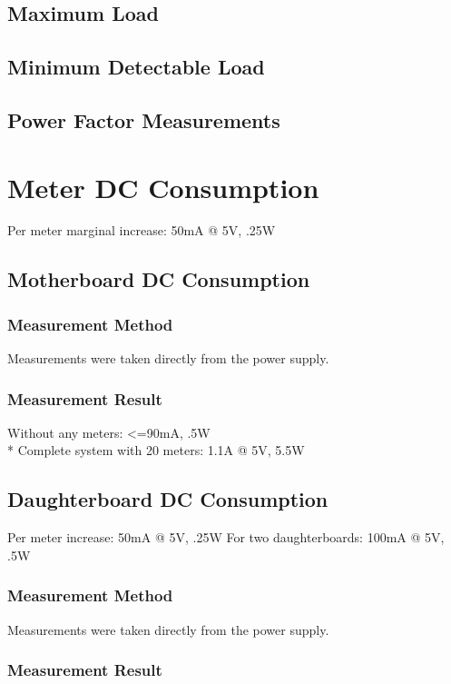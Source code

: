 \documentclass[]{article}
\begin{document}
\subsection{Maximum Load}

\subsection{Minimum Detectable Load}

\subsection{Power Factor Measurements}

\section{Meter DC Consumption}
Per meter marginal increase: 50mA @ 5V, .25W

\subsection{Motherboard DC Consumption}

\subsubsection{Measurement Method}
Measurements were taken directly from the power supply.
\subsubsection{Measurement Result}
Without any meters: <=90mA, .5W \\*
Complete system with 20 meters: 1.1A @ 5V, 5.5W

\subsection{Daughterboard DC Consumption}
Per meter increase: 50mA @ 5V, .25W
For two daughterboards: 100mA @ 5V, .5W

\subsubsection{Measurement Method}
Measurements were taken directly from the power supply.
\subsubsection{Measurement Result}
\end{document}
